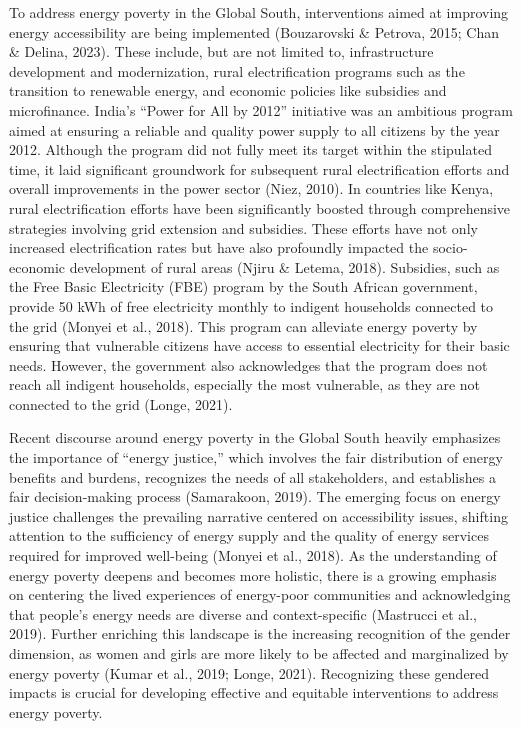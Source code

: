 \documentclass[
  twoside,
  openright,
  degree    = master,               %
  language  = english,              %
  fontset   = overleaf,             %
  watermark = true,                 %
  doi       = true,                 %
]{ntuthesis}
\begin{document}
To address energy poverty in the Global South, interventions aimed at
improving energy accessibility are being implemented (Bouzarovski \&
Petrova, 2015; Chan \& Delina, 2023). These include, but are not limited
to, infrastructure development and modernization, rural electrification
programs such as the transition to renewable energy, and economic
policies like subsidies and microfinance. India's ``Power for All by
2012'' initiative was an ambitious program aimed at ensuring a reliable
and quality power supply to all citizens by the year 2012. Although the
program did not fully meet its target within the stipulated time, it
laid significant groundwork for subsequent rural electrification efforts
and overall improvements in the power sector (Niez, 2010). In countries
like Kenya, rural electrification efforts have been significantly
boosted through comprehensive strategies involving grid extension and
subsidies. These efforts have not only increased electrification rates
but have also profoundly impacted the socio-economic development of
rural areas (Njiru \& Letema, 2018). Subsidies, such as the Free Basic
Electricity (FBE) program by the South African government, provide 50
kWh of free electricity monthly to indigent households connected to the
grid (Monyei et al., 2018). This program can alleviate energy poverty by
ensuring that vulnerable citizens have access to essential electricity
for their basic needs. However, the government also acknowledges that
the program does not reach all indigent households, especially the most
vulnerable, as they are not connected to the grid (Longe, 2021).

Recent discourse around energy poverty in the Global South heavily
emphasizes the importance of ``energy justice,'' which involves the fair
distribution of energy benefits and burdens, recognizes the needs of all
stakeholders, and establishes a fair decision-making process
(Samarakoon, 2019). The emerging focus on energy justice challenges the
prevailing narrative centered on accessibility issues, shifting
attention to the sufficiency of energy supply and the quality of energy
services required for improved well-being (Monyei et al., 2018). As the
understanding of energy poverty deepens and becomes more holistic, there
is a growing emphasis on centering the lived experiences of energy-poor
communities and acknowledging that people's energy needs are diverse and
context-specific (Mastrucci et al., 2019). Further enriching this
landscape is the increasing recognition of the gender dimension, as
women and girls are more likely to be affected and marginalized by
energy poverty (Kumar et al., 2019; Longe, 2021). Recognizing these
gendered impacts is crucial for developing effective and equitable
interventions to address energy poverty.
\end{document}
